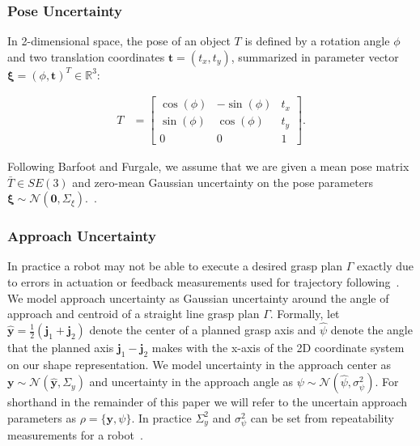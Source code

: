 \documentclass[10pt, conference]{ieeeconf}      %
\newcommand{\bj}{\mathbf{j}}
\newcommand{\bt}{\mathbf{t}}
\newcommand{\by}{\mathbf{y}}
\newcommand{\mN}{\mathcal{N}}
\begin{document}
\subsubsection{Pose Uncertainty}
In 2-dimensional space, the pose of an object $T$ is defined by a rotation angle $\phi$ and two translation coordinates $\bt = (t_x, t_y)$, summarized in parameter vector $\mathbf{\xi} = (\phi, \bt)^T \in \mathbb{R}^3$:

\vspace{-2ex}
\begin{align*}
	T &= \left[  \begin{array}{ccc}
		\cos(\phi) & -\sin(\phi) & t_x \\
		\sin(\phi) & \cos(\phi) & t_y \\
		0 & 0 & 1
		\end{array} \right] .
\end{align*}

\noindent Following Barfoot and Furgale, we assume that we are given a mean pose matrix $\bar{T} \in SE(3)$ and zero-mean Gaussian uncertainty on the pose parameters $\mathbf{\xi} \sim \mN \left( \mathbf{0}, \Sigma_{\xi} \right)$.~\cite{barfoot2014Pose}.

 
 \subsubsection{Approach Uncertainty}
In practice a robot may not be able to execute a desired grasp plan $\Gamma$ exactly due to errors in actuation or feedback measurements used for trajectory following~\cite{kehoe2012estimating}.
We model approach uncertainty as Gaussian uncertainty around the angle of approach and centroid of a straight line grasp plan $\Gamma$.
Formally, let $\hat{\by} = \frac{1}{2} (\bj_1 + \bj_2)$ denote the center of a planned grasp axis and $\hat{\psi}$ denote the angle that the planned axis $\bj_1 - \bj_2$ makes with the x-axis of the 2D coordinate system on our shape representation.
We model uncertainty in the approach center as $\by \sim \mN(\hat{\by}, \Sigma_y)$ and uncertainty in the approach angle as $\psi \sim \mN(\hat{\psi}, \sigma_{\psi}^2)$.
For shorthand in the remainder of this paper we will refer to the uncertain approach parameters as $\rho = \{\by, \psi \}$.
In practice $\Sigma_{y}^2$ and $\sigma_{\psi}^2$ can be set from repeatability measurements for a robot~\cite{mooring1986determination}.
\end{document}
